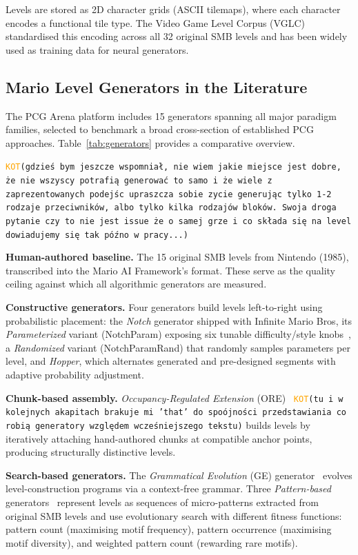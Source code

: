 \documentclass[shortabstract, mgr, english]{iithesis}
\newcommand{\DEBUG}[1]{{#1}} %
\newcommand{\KOT}[1]{\DEBUG{\tt{\textcolor{orange}{KOT}(}{#1}{)}}}
\begin{document}
Levels are stored as 2D character grids (ASCII tilemaps), where each character
encodes a functional tile type. The Video Game Level Corpus
(VGLC)~\citep{summerville2016super} standardised this encoding across all 32
original SMB levels and has been widely used as training data for neural
generators.

\subsection{Mario Level Generators in the Literature}
\label{subsec:bg-mario-generators}

The PCG Arena platform includes 15 generators spanning all major paradigm
families, selected to benchmark a broad cross-section of established PCG
approaches. Table~\ref{tab:generators} provides a comparative overview.

\KOT{gdzieś bym jeszcze wspomniał, nie wiem jakie miejsce jest dobre, że nie wszyscy potrafią generować to samo i że wiele z zaprezentowanych podejśc upraszcza sobie zycie generując tylko 1-2 rodzaje przeciwników, albo tylko kilka rodzajów bloków. Swoja droga pytanie czy to nie jest issue że o samej grze i co składa się na level dowiadujemy się tak późno w pracy...}


\textbf{Human-authored baseline.} The 15 original SMB levels from Nintendo
(1985), transcribed into the Mario AI Framework's format. These serve as the
quality ceiling against which all algorithmic generators are measured.

\textbf{Constructive generators.} Four generators build levels left-to-right
using probabilistic placement: the \emph{Notch} generator shipped with Infinite
Mario Bros, its \emph{Parameterized} variant (NotchParam) exposing six tunable
difficulty/style knobs~\citep{shaker2011mario}, a \emph{Randomized} variant
(NotchParamRand) that randomly samples parameters per level, and \emph{Hopper},
which alternates generated and pre-designed segments with adaptive probability
adjustment.

\textbf{Chunk-based assembly.} \emph{Occupancy-Regulated Extension}
(ORE)~\citep{mawhorter2010occupancy} \KOT{tu i w kolejnych akapitach brakuje mi 'that' do spoójności przedstawiania co robią generatory względem wcześniejszego tekstu} builds levels by iteratively attaching
hand-authored chunks at compatible anchor points, producing structurally
distinctive levels.

\textbf{Search-based generators.} The \emph{Grammatical Evolution} (GE)
generator~\citep{shaker2012evolving} evolves level-construction programs via a
context-free grammar. Three \emph{Pattern-based}
generators~\citep{dahlskog2014procedural} represent levels as sequences of
micro-patterns extracted from original SMB levels and use evolutionary search
with different fitness functions: pattern count (maximising motif frequency),
pattern occurrence (maximising motif diversity), and weighted pattern count
(rewarding rare motifs).
\end{document}
